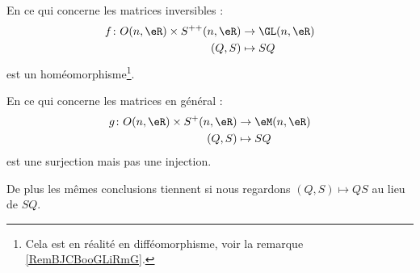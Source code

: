 \begin{theorem} \label{ThoLHebUAU}
   En ce qui concerne les matrices inversibles :
   \begin{equation}
       \begin{aligned}
           f\colon O(n,\eR)\times S^{++}(n,\eR)&\to \GL(n,\eR) \\
           (Q,S)&\mapsto SQ 
       \end{aligned}
   \end{equation}
   est un homéomorphisme\footnote{Cela est en réalité en difféomorphisme, voir la remarque \ref{RemBJCBooGLiRmG}.}.

   En ce qui concerne les matrices en général :
   \begin{equation}
       \begin{aligned}
           g\colon O(n,\eR)\times S^+(n,\eR)&\to \eM(n,\eR) \\
           (Q,S)&\mapsto SQ 
       \end{aligned}
   \end{equation}
   est une surjection mais pas une injection.

   De plus les mêmes conclusions tiennent si nous regardons \( (Q,S)\mapsto QS\) au lieu de \( SQ\).
\end{theorem}



